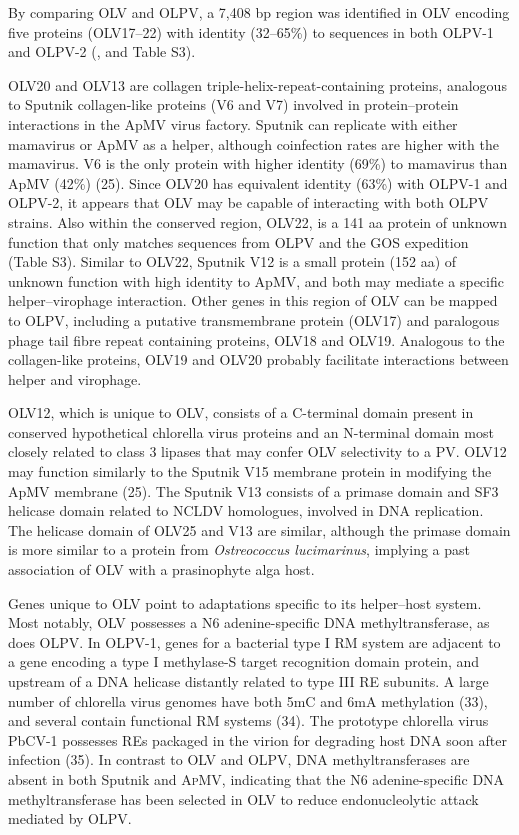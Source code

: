 By comparing \ac{OLV} and \ac{OLPV}, a 7,408 bp region was identified in \ac{OLV} encoding five proteins (OLV17--22) with identity (32--65\%) to sequences in both \ac{OLPV}-1 and \ac{OLPV}-2 (,  and Table S3). 

OLV20 and OLV13 are collagen triple-helix-repeat-containing proteins, analogous to Sputnik collagen-like proteins (V6 and V7) involved in protein--protein interactions in the \ac{ApMV} virus factory. 
Sputnik can replicate with either mamavirus or \ac{ApMV} as a helper, although coinfection rates are higher with the mamavirus. 
V6 is the only protein with higher identity (69\%) to mamavirus than \ac{ApMV} (42\%) (25). 
Since OLV20 has equivalent identity (63\%) with \ac{OLPV}-1 and \ac{OLPV}-2, it appears that \ac{OLV} may be capable of interacting with both \ac{OLPV} strains. 
Also within the conserved region, OLV22, is a 141 aa protein of unknown function that only matches sequences from \ac{OLPV} and the \ac{GOS} expedition (Table S3). 
Similar to OLV22, Sputnik V12 is a small protein (152 aa) of unknown function with high identity to \ac{ApMV}, and both may mediate a specific helper--virophage interaction. 
Other genes in this region of \ac{OLV} can be mapped to \ac{OLPV}, including a putative transmembrane protein (OLV17) and paralogous phage tail fibre repeat containing proteins, OLV18 and OLV19. 
Analogous to the collagen-like proteins, OLV19 and OLV20 probably facilitate interactions between helper and virophage. 

OLV12, which is unique to \ac{OLV}, consists of a C-terminal domain present in conserved hypothetical chlorella virus proteins and an N-terminal domain most closely related to class 3 lipases that may confer \ac{OLV} selectivity to a \ac{PV}. 
OLV12 may function similarly to the Sputnik V15 membrane protein in modifying the \ac{ApMV} membrane (25). 
The Sputnik V13 consists of a primase domain and SF3 helicase domain related to \ac{NCLDV} homologues, involved in \textsc{DNA} replication. 
The helicase domain of OLV25 and V13 are similar, although the primase domain is more similar to a protein from \emph{Ostreococcus lucimarinus}, implying a past association of \ac{OLV} with a prasinophyte alga host. 

Genes unique to \ac{OLV} point to adaptations specific to its helper--host system. 
Most notably, \ac{OLV} possesses a N6 adenine-specific \textsc{DNA} methyltransferase, as does \ac{OLPV}. 
In \ac{OLPV}-1, genes for a bacterial type I \ac{RM} system are adjacent to a gene encoding a type I methylase-S target recognition domain protein, and upstream of a \textsc{DNA} helicase distantly related to type III \ac{RE} subunits. 
A large number of chlorella virus genomes have both 5mC and 6mA methylation (33), and several contain functional \ac{RM} systems (34). 
The prototype chlorella virus PbCV-1 possesses REs packaged in the virion for degrading host \textsc{DNA} soon after infection (35). 
In contrast to \ac{OLV} and \ac{OLPV}, \textsc{DNA} methyltransferases are absent in both Sputnik and \textsc{ApMV}, indicating that the N6 adenine-specific \textsc{DNA} methyltransferase has been selected in \ac{OLV} to reduce endonucleolytic attack mediated by \ac{OLPV}. 


